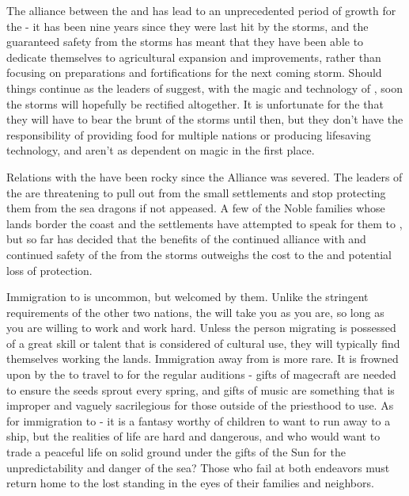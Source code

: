 \documentclass[blue]{GL2020}
\begin{document}
The alliance between the \pSun{} and \pTech{} has lead to an unprecedented period of growth for the \pSunCh{} - it has been nine years since they were last hit by the storms, and the guaranteed safety from the storms has meant that they have been able to dedicate themselves to agricultural expansion and improvements, rather than focusing on preparations and fortifications for the next coming storm.  Should things continue as the leaders of \pTech{} suggest, with the magic and technology of \pTech{}, soon the storms will hopefully be rectified altogether.  It is unfortunate for the \pShip{} that they will have to bear the brunt of the storms until then, but they don't have the responsibility of providing food for multiple nations or producing lifesaving technology, and aren't as dependent on magic in the first place.

Relations with the \pShip{} have been rocky since the Alliance was severed.  The leaders of the \pShip{} are threatening to pull out from the small settlements and stop protecting them from the sea dragons if not appeased.  A few of the Noble families whose lands border the coast and the \pShip{} settlements have attempted to speak for them to \cQueen{}, but so far \cQueen{\they} has decided that the benefits of the continued alliance with \pTechies{} and continued safety of the \pFarm{} from the storms outweighs the cost to the \pShip{} and potential loss of protection.

Immigration to \pFarm{} is uncommon, but welcomed by them.  Unlike the stringent requirements of the other two nations, the \pFarm{} will take you as you are, so long as you are willing to work and work hard.  Unless the person migrating is possessed of a great skill or talent that is considered of cultural use, they will typically find themselves working the lands.  Immigration away from \pFarm{} is more rare.  It is frowned upon by the \pFarm{} to travel to \pTech{} for the regular auditions - gifts of magecraft are needed to ensure the seeds sprout every spring, and gifts of music are something that is improper and vaguely sacrilegious for those outside of the priesthood to use.  As for immigration to \pShip{} - it is a fantasy worthy of children to want to run away to a \pShippies{} ship, but the realities of \pShip{} life are hard and dangerous, and who would want to trade a peaceful life on solid ground under the gifts of the Sun for the unpredictability and danger of the sea?  Those who fail at both endeavors must return home to the lost standing in the eyes of their families and neighbors.
\end{document}
